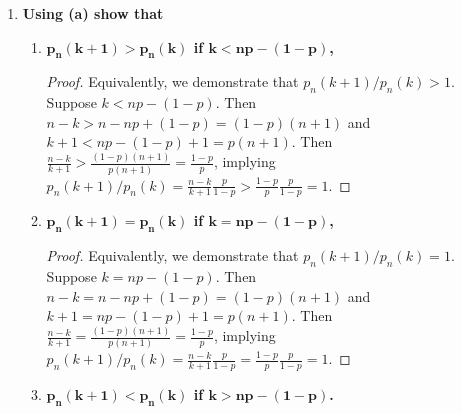 \documentclass[10pt, oneside]{article}   	%
\theoremstyle{definition}
\begin{document}
\begin{enumerate}[label=4.\arabic*]
\begin{enumerate}
	\begin{proof}
	We have $p_n (k + 1) = \binom{n}{k+1} p^{k+1} (1-p)^{n-(k+1)} = \frac{n!}{(k+1)! (n- (k+1))!} p^{k+1} (1-p)^{n-(k+1)}$ and $p_n (k) = \binom{n}{k} p^k (1-p)^{n-k} = \frac{n!}{k! (n-k)!}  p^k (1-p)^{n-k}$. It immediately follows that $p_n (k+1) / p_n (k) = [(n-k) / (k+1)] [p / (1 - p)]$.
	\end{proof}
	
	\item  \begin{tcolorbox}[
	  colback=Cerulean!5!white,
	  colframe=Cerulean!75!black]
	\textbf{Using (a) show that}
	\end{tcolorbox}
	
		\begin{enumerate}
		\item  \begin{tcolorbox}[
	  	colback=Cerulean!5!white,
	  	colframe=Cerulean!75!black]
		\textbf{$\bm{p_n (k + 1) > p_n (k)}$ if $\bm{k < np - (1 - p)}$,}
		\end{tcolorbox}
		
		\begin{proof}
		Equivalently, we demonstrate that $p_n (k+1) / p_n (k) > 1$. Suppose $k < np - (1 - p)$. Then $n - k > n - np + (1-p) = (1 - p)(n + 1)$ and $k + 1 < np - (1 - p) + 1 = p(n+1)$. Then $\frac{n-k}{k+1} > \frac{(1-p)(n+1)}{p(n+1)} = \frac{1-p}{p}$, implying $p_n (k+1) / p_n (k) = \frac{n-k}{k+1} \frac{p}{1-p} > \frac{1-p}{p} \frac{p}{1-p} = 1$.
		\end{proof}
		
		\item  \begin{tcolorbox}[
	  	colback=Cerulean!5!white,
	  	colframe=Cerulean!75!black]
		\textbf{$\bm{p_n (k + 1) = p_n (k)}$ if $\bm{k = np - (1 - p)}$,}
		\end{tcolorbox}
		
		\begin{proof}
		Equivalently, we demonstrate that $p_n (k+1) / p_n (k) = 1$. Suppose $k = np - (1 - p)$. Then $n - k = n - np + (1-p) = (1 - p)(n + 1)$ and $k + 1 = np - (1 - p) + 1 = p(n+1)$. Then $\frac{n-k}{k+1} = \frac{(1-p)(n+1)}{p(n+1)} = \frac{1-p}{p}$, implying $p_n (k+1) / p_n (k) = \frac{n-k}{k+1} \frac{p}{1-p} = \frac{1-p}{p} \frac{p}{1-p} = 1$.
		\end{proof}
		
		\item  \begin{tcolorbox}[
	  	colback=Cerulean!5!white,
	  	colframe=Cerulean!75!black]
		\textbf{$\bm{p_n (k + 1) < p_n (k)}$ if $\bm{k > np - (1 - p)}$.}
		\end{tcolorbox}
		

\end{enumerate}
\end{enumerate}
\end{enumerate}
\end{document}
